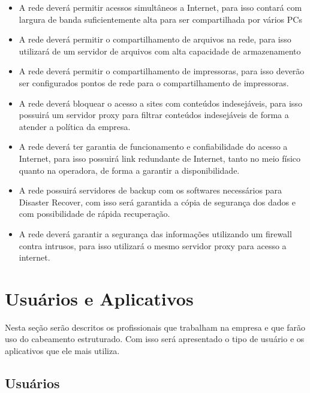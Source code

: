 \documentclass[	DIV=calc,%
							paper=a4,%
							fontsize=12pt,%
							onecolumn]{scrartcl}	 					%
\begin{document}
\begin{itemize}				
\item A rede deverá permitir acessos simultâneos a Internet, para isso contará com largura de banda suficientemente alta para ser compartilhada por vários PCs
\item A rede deverá permitir o compartilhamento de arquivos na rede, para isso utilizará de um servidor de arquivos com alta capacidade de armazenamento 
\item A rede deverá permitir o compartilhamento de impressoras, para isso deverão ser configurados pontos de rede para o compartilhamento de impressoras.		
\item A rede deverá bloquear o acesso a sites com conteúdos indesejáveis, para isso possuirá um servidor proxy para filtrar conteúdos indesejáveis de forma a atender a política da empresa.
\item A rede deverá ter garantia de funcionamento e confiabilidade do acesso a Internet, para isso possuirá link redundante de Internet, tanto no meio físico quanto na operadora, de forma a garantir a disponibilidade.
\item A rede possuirá servidores de backup com os softwares necessários para Disaster Recover, com isso será garantida a cópia de segurança dos dados e com possibilidade de rápida recuperação.
\item A rede deverá garantir a segurança das informações utilizando um firewall contra intrusos, para isso utilizará o mesmo servidor proxy para acesso a internet.
\end{itemize}

\section{Usuários e Aplicativos}
Nesta seção serão descritos os profissionais que trabalham na empresa e que farão uso do cabeamento estruturado. Com isso será apresentado o tipo de usuário e os aplicativos que ele mais utiliza. 

\subsection{Usuários}
\end{document}
